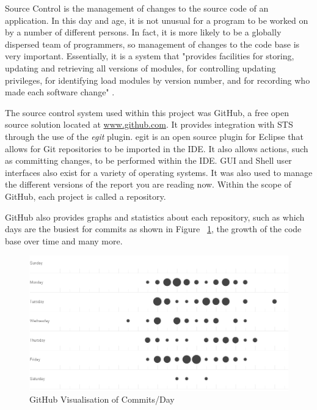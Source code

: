 Source Control is the management of changes to the source code of an application. In this day and age, it is not unusual for a program to be worked on by a number of different persons. In fact, it is more likely to be a globally dispersed team of programmers, so management of changes to the code base is very important. Essentially, it is a system that "provides facilities for storing, updating and retrieving all versions of modules, for controlling updating privileges, for identifying load modules by version number, and for recording who made each software change" \parencite{rochkind1975source}.

The source control system used within this project was GitHub, a free open source solution located at \href{http://www.github.com}{www.github.com}. It provides integration with STS through the use of the \textit{egit} plugin. egit is an open source plugin for Eclipse that allows for Git repositories to be imported in the IDE. It also allows actions, such as committing changes, to be performed within the IDE. GUI and Shell user interfaces also exist for a variety of operating systems. It was also used to manage the different versions of the report you are reading now. Within the scope of GitHub, each project is called a repository.

GitHub also provides graphs and statistics about each repository, such as which days are the busiest for commits as shown in Figure ~\ref{fig:git}, the growth of the code base over time and many more.

\begin{figure}[H]
\begin{center}
\includegraphics[width=15cm]{git.png}
\end{center}
\caption{GitHub Visualisation of Commits/Day}
\label{fig:git}
\end{figure}

